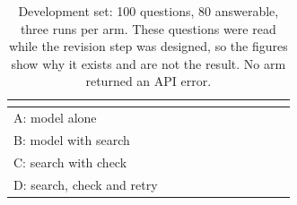 \begin{table}[tbp]
  \centering
  \caption{Development set: 100 questions, 80 answerable, three runs per arm. These questions were read while the revision step was designed, so the figures show why it exists and are not the result. No arm returned an API error.}
  \label{tab:development}
  \begin{tabular}{
    l
    S[table-format=2.1] l
    S[table-format=2.1] l
    S[table-format=2.1] l
    S[table-format=2.1] l
    S[table-format=1.1] l
  }
    \toprule
     &  &  &  &  &  \\
    \midrule
    A: model alone &  &  &  &  &  \\
    B: model with search &  &  &  &  &  \\
    C: search with check &  &  &  &  &  \\
    D: search, check and retry &  &  &  &  &  \\
    \bottomrule
  \end{tabular}
\end{table}

